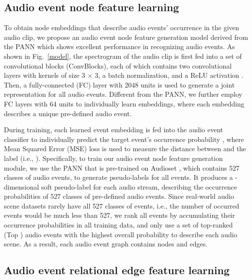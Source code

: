 \documentclass{article}
\begin{document}
\vspace{-0.4cm}
\subsection{Audio event node feature learning}\label{sec:node_event_label}

\vspace{-0.2cm}
To obtain node embeddings that describe audio events' occurrence in the given audio clip, we propose an audio event node feature generation model derived from the PANN \cite{kong2020panns} which shows excellent performance in recognizing audio events. 
As shown in Fig.~\ref{model}, the spectrogram of the audio clip is first fed into a set of convolutional blocks (ConvBlocks), each of which contains two convolutional layers with kernels of size 3 × 3, a batch normalization, and a ReLU activation \cite{kong2020panns}. Then, a fully-connected (FC) layer with 2048 units is used to generate a joint representation for all audio events. Different from the PANN, we further employ  FC layers with 64 units to individually learn  embeddings, where each embedding describes a unique pre-defined audio event. 
 


During training, each learned event embedding  is fed into the audio event classifier to individually predict the target event's occurrence probability , where Mean Squared Error (MSE) loss is used to measure the distance between  and the label  (i.e., 
). 
Specifically, to train our audio event node feature generation module, 
we use the PANN that is pre-trained on Audioset \cite{aduioset}, which contains 527 classes of audio events, to generate pseudo-labels for all events. 
It produces a -dimensional soft pseudo-label  for each audio stream, describing the occurrence probabilities of 527 classes of pre-defined audio events. 
Since 
real-world audio scene datasets rarely have all 527 classes of events,
i.e., the number of occurred events would be much less than 527, we rank all events by accumulating their occurrence probabilities in all training data, and only use a set of top-ranked (Top ) audio events with the highest overall probability to describe each audio scene. As a result, each audio event graph contains  nodes and  edges.








\vspace{-0.4cm}
\subsection{Audio event relational edge feature learning}
\end{document}

